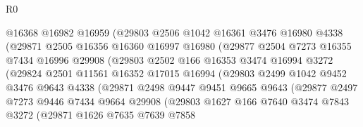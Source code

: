 \begin{lexlean}{R0}
\begin{coremodule}
                      @16368
                      @16982
                      @16959
                      (@29803
                        @2506
                        @1042
                        @16361
                        @3476
                        @16980
                        @4338
                        (@29871
                          @2505
                          @16356
                          @16360
                          @16997
                          @16980
                          (@29877
                            @2504
                            @7273
                            @16355
                            @7434
                            @16996
                            @29908
                            (@29803
                              @2502
                              @166
                              @16353
                              @3474
                              @16994
                              @3272
                              (@29824
                                @2501
                                @11561
                                @16352
                                @17015
                                @16994
                                (@29803
                                  @2499
                                  @1042
                                  @9452
                                  @3476
                                  @9643
                                  @4338
                                  (@29871
                                    @2498
                                    @9447
                                    @9451
                                    @9665
                                    @9643
                                    (@29877
                                      @2497
                                      @7273
                                      @9446
                                      @7434
                                      @9664
                                      @29908
                                      (@29803
                                        @1627
                                        @166
                                        @7640
                                        @3474
                                        @7843
                                        @3272
                                        (@29871
                                          @1626
                                          @7635
                                          @7639
                                          @7858

\end{coremodule}
\end{lexlean}
